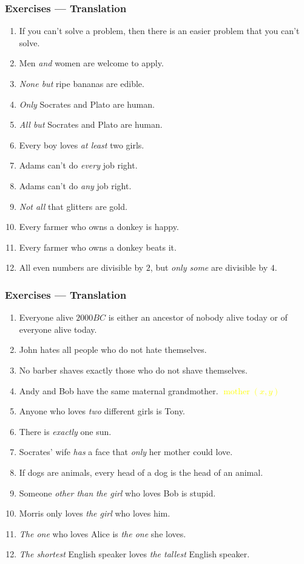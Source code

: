 \documentclass[UTF8,11pt,colorlinks,compress,openany]{beamer}%
\begin{document}
\begin{frame}\frametitle{Exercises --- Translation}
		\begin{enumerate}
			\item If you can't solve a problem, then there is an easier problem that you can't solve.
			\item Men \emph{and} women are welcome to apply.
			\item \emph{None but} ripe bananas are edible.
			\item \emph{Only} Socrates and Plato are human.
			\item \emph{All but} Socrates and Plato are human.
			\item Every boy loves \emph{at least} two girls.
			\item Adams can't do \emph{every} job right.
			\item Adams can't do \emph{any} job right.
			\item \emph{Not all} that glitters are gold.
			\item Every farmer who owns a donkey is happy.
			\item Every farmer who owns a donkey beats it.
			\item All even numbers are divisible by $2$, but \emph{only some} are divisible by $4$.
		\end{enumerate}
\end{frame}

\begin{frame}\frametitle{Exercises --- Translation}
		\begin{enumerate}
			\item Everyone alive $2000BC$ is either an ancestor of nobody alive today or of everyone alive today.
			\item John hates all people who do not hate themselves.
			\item No barber shaves exactly those who do not shave themselves.
			\item Andy and Bob have the same maternal grandmother. \quad\textcolor{yellow}{$\operatorname{mother}(x,y)$}
			\item Anyone who loves \emph{two} different girls is Tony.
			\item There is \emph{exactly} one sun.
			\item Socrates' wife \emph{has} a face that \emph{only} her mother could love.
			\item If dogs are animals, every head of a dog is the head of an animal.
			\item Someone \emph{other than} \emph{the girl} who loves Bob is stupid.
			\item Morris only loves \emph{the girl} who loves him.
			\item \emph{The one} who loves Alice is \emph{the one} she loves.
			\item \emph{The shortest} English speaker loves \emph{the tallest} English speaker.
		\end{enumerate}
\end{frame}
\end{document}
